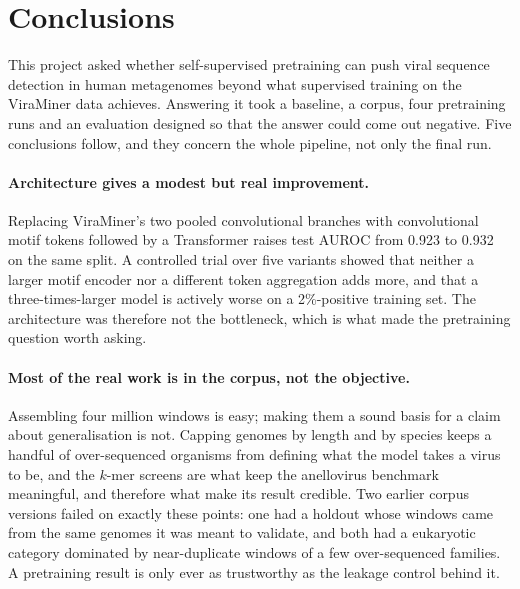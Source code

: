 \documentclass[10pt,twocolumn,a4paper]{article}
\begin{document}
\section{Conclusions}\label{sec:conclusions}

This project asked whether self-supervised pretraining can push viral sequence
detection in human metagenomes beyond what supervised training on the ViraMiner
data achieves. Answering it took a baseline, a corpus, four pretraining runs and
an evaluation designed so that the answer could come out negative. Five
conclusions follow, and they concern the whole pipeline, not only the final run.

\paragraph{Architecture gives a modest but real improvement.}
Replacing ViraMiner's two pooled convolutional branches with convolutional motif
tokens followed by a Transformer raises test AUROC from 0.923 to 0.932 on the
same split. A controlled trial over five variants showed that neither a larger
motif encoder nor a different token aggregation adds more, and that a
three-times-larger model is actively worse on a 2\%-positive training set. The
architecture was therefore not the bottleneck, which is what made the
pretraining question worth asking.

\paragraph{Most of the real work is in the corpus, not the objective.}
Assembling four million windows is easy; making them a sound basis for a claim
about generalisation is not. Capping genomes by length and by species keeps a
handful of over-sequenced organisms from defining what the model takes a virus to
be, and the $k$-mer screens are what keep the anellovirus benchmark meaningful,
and therefore what make its result credible. Two earlier corpus versions failed
on exactly these points: one had a holdout whose windows came from the same
genomes it was meant to validate, and both had a eukaryotic category dominated by
near-duplicate windows of a few over-sequenced families. A
pretraining result is only ever as trustworthy as the leakage control behind it.
\end{document}
